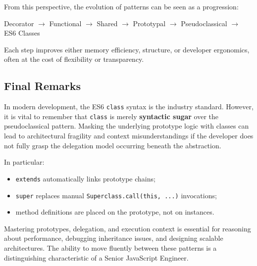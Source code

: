 \documentclass{scrbook}
\begin{document}
From this perspective, the evolution of patterns can be seen as a progression:

\begin{center}
Decorator $\rightarrow$ Functional $\rightarrow$ Shared $\rightarrow$ Prototypal $\rightarrow$ Pseudoclassical $\rightarrow$ ES6 Classes
\end{center}

Each step improves either memory efficiency, structure, or developer ergonomics, often at the cost of flexibility or transparency.

\subsection{Final Remarks}

In modern development, the ES6 \texttt{class} syntax is the industry standard. However, it is vital to remember that \texttt{class} is merely \textbf{syntactic sugar} over the pseudoclassical pattern. Masking the underlying prototype logic with classes can lead to architectural fragility and context misunderstandings if the developer does not fully grasp the delegation model occurring beneath the abstraction.

In particular:

\begin{itemize}
    \item \texttt{extends} automatically links prototype chains;
    \item \texttt{super} replaces manual \texttt{Superclass.call(this, ...)} invocations;
    \item method definitions are placed on the prototype, not on instances.
\end{itemize}

Mastering prototypes, delegation, and execution context is essential for reasoning about performance, debugging inheritance issues, and designing scalable architectures. The ability to move fluently between these patterns is a distinguishing characteristic of a Senior JavaScript Engineer.
\end{document}
